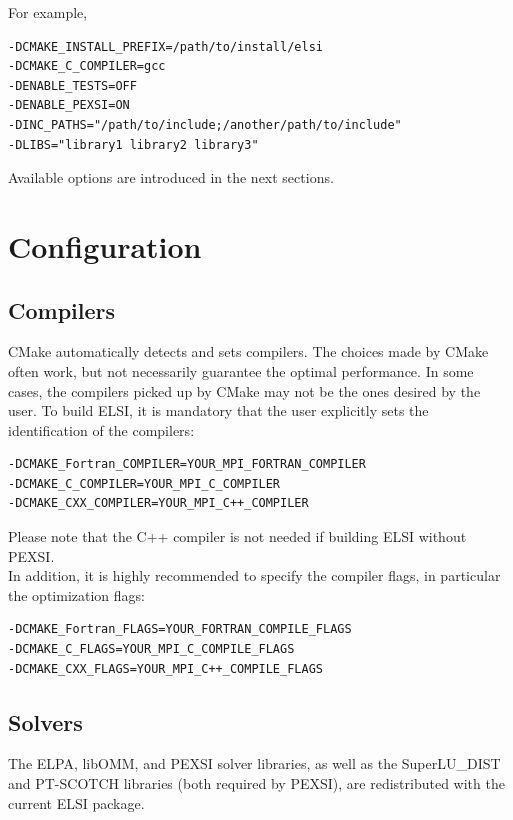 \documentclass{report}
\begin{document}
For example,\\

\begin{verbatim}
-DCMAKE_INSTALL_PREFIX=/path/to/install/elsi
-DCMAKE_C_COMPILER=gcc
-DENABLE_TESTS=OFF
-DENABLE_PEXSI=ON
-DINC_PATHS="/path/to/include;/another/path/to/include"
-DLIBS="library1 library2 library3"
\end{verbatim}

Available options are introduced in the next sections.\\

\section{Configuration}
\label{sec:config}
\subsection{Compilers}
\label{subsec:config_compilers}
CMake automatically detects and sets compilers.  The choices made by CMake often work, but not necessarily guarantee the optimal performance.  In some cases, the compilers picked up by CMake may not be the ones desired by the user.  To build ELSI, it is mandatory that the user explicitly sets the identification of the compilers:\\

\begin{verbatim}
-DCMAKE_Fortran_COMPILER=YOUR_MPI_FORTRAN_COMPILER
-DCMAKE_C_COMPILER=YOUR_MPI_C_COMPILER
-DCMAKE_CXX_COMPILER=YOUR_MPI_C++_COMPILER
\end{verbatim}

Please note that the C++ compiler is not needed if building ELSI without PEXSI.\\

In addition, it is highly recommended to specify the compiler flags, in particular the optimization flags:\\

\begin{verbatim}
-DCMAKE_Fortran_FLAGS=YOUR_FORTRAN_COMPILE_FLAGS
-DCMAKE_C_FLAGS=YOUR_MPI_C_COMPILE_FLAGS
-DCMAKE_CXX_FLAGS=YOUR_MPI_C++_COMPILE_FLAGS
\end{verbatim}

\subsection{Solvers}
\label{subsec:config_solvers}
The ELPA, libOMM, and PEXSI solver libraries, as well as the SuperLU\_DIST and PT-SCOTCH libraries (both required by PEXSI), are redistributed with the current ELSI package.\\
\end{document}
